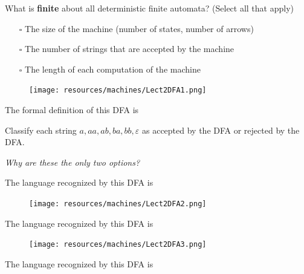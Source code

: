 \documentclass[12pt, oneside]{article}
\begin{document}
What is {\bf finite} about all deterministic finite automata? (Select all that apply)
\begin{itemize}
   \item[$\square$] The size of the machine (number of states, number of arrows)
   \item[$\square$] The number of strings that are accepted by the machine
   \item[$\square$] The length of each computation of the machine
\end{itemize}
  
\begin{figure}[h]
   \centering
   \texttt{[image: resources/machines/Lect2DFA1.png]} 
\end{figure}
   
The formal definition of this DFA is
   
\vspace{100pt}
   

Classify each string $a, aa, ab, ba, bb, \varepsilon$ as accepted by the DFA or rejected by the DFA.  

{\it Why are these the only two options?}

\vspace{200pt}


The language recognized by this DFA is
  
\vspace{100pt}
   

\begin{figure}[h]
  \centering
  \texttt{[image: resources/machines/Lect2DFA2.png]} 
\end{figure}
   

The language recognized by this DFA is
  
\vspace{100pt}

\begin{figure}[h]
    \centering
    \texttt{[image: resources/machines/Lect2DFA3.png]} 
\end{figure}

The language recognized by this DFA is
  
\vspace{100pt}
 \vfill
\end{document}
